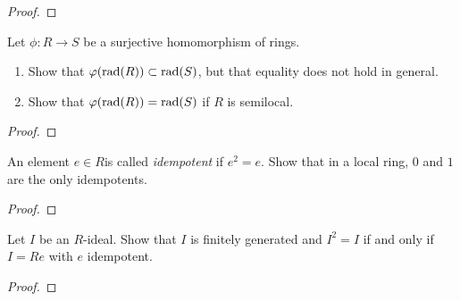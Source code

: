 \begin{proof}
\end{proof}
\newpage
\begin{problem}
Let $\phi\colon R\to S$ be a surjective homomorphism of
rings.
\begin{enumerate}[noitemsep,label=(\alph*)]
\item Show that $\varphi(\mathrm{rad}(R))\subset\mathrm{rad}(S)$, but that
  equality does not hold in general.
\item Show that $\varphi(\mathrm{rad}(R))=\mathrm{rad}(S)$ if $R$ is semilocal.
\end{enumerate}
\end{problem}
\begin{proof}
\end{proof}
\newpage
\begin{problem}
An element $e\in R$is called \emph{idempotent} if $e^2=e$. Show
that in a local ring, $0$ and $1$ are the only idempotents.
\end{problem}
\begin{proof}
\end{proof}
\newpage
\begin{problem}
Let $I$ be an $R$-ideal. Show that $I$ is finitely generated and
$I^2=I$ if and only if $I=Re$ with $e$ idempotent.
\end{problem}
\begin{proof}
\end{proof}

